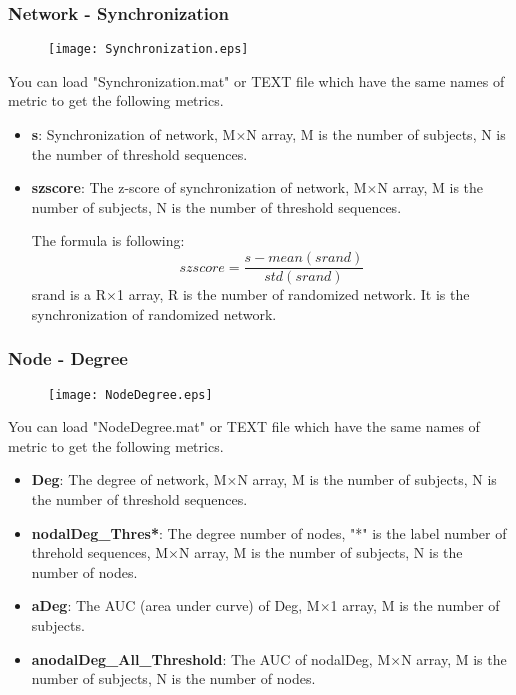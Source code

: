 \documentclass[11pt]{article}
\begin{document}
			\subsubsection{Network - Synchronization}
				\begin{figure}
					\begin{center}
						\texttt{[image: Synchronization.eps]}
					\end{center}
				\end{figure}
				You can load "Synchronization.mat" or TEXT file which have the same names of metric to get the following metrics.
				\begin{itemize}
					\item \textbf{s}: Synchronization of network,
						M$\times$N array, M is the number of subjects, N is the number of threshold sequences.
					\item \textbf{szscore}: The z-score of synchronization of network,
						M$\times$N array, M is the number of subjects, N is the number of threshold sequences.

						The formula is following:
						$$szscore=\frac{s-mean(srand)}{std(srand)}$$
						srand is a R$\times$1 array, R is the number of randomized network. 
						It is the synchronization of randomized network.
				\end{itemize}
			\subsubsection{Node - Degree}
				\begin{figure}
					\begin{center}
						\texttt{[image: NodeDegree.eps]}
					\end{center}
				\end{figure}
				You can load "NodeDegree.mat" or TEXT file which have the same names of metric to get the following metrics.
				\begin{itemize}
					\item \textbf{Deg}: The degree of network,
						M$\times$N array, M is the number of subjects, N is the number of threshold sequences.
					\item \textbf{nodalDeg\_Thres*}: The degree number of nodes, "*" is the label number of threhold sequences,
						M$\times$N array, M is the number of subjects, N is the number of nodes.
					\item \textbf{aDeg}: The AUC (area under curve) of Deg,
						M$\times$1 array, M is the number of subjects.
					\item \textbf{anodalDeg\_All\_Threshold}: The AUC of nodalDeg,
						M$\times$N array, M is the number of subjects, N is the number of nodes.
				\end{itemize}
\end{document}

